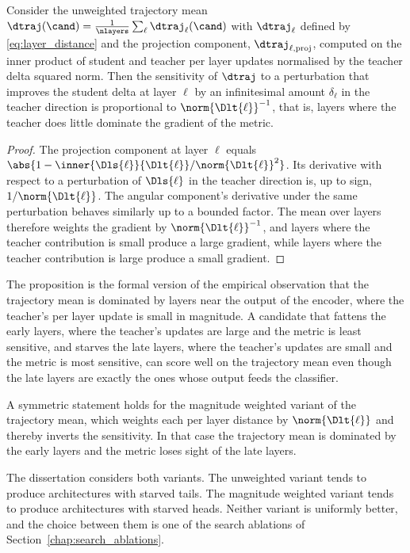 \begin{proposition}
\label{prop:magnitude_bias}
Consider the unweighted trajectory mean $\dtraj(\cand) = \frac{1}{\nlayers} \sum_\ell \dtraj_\ell(\cand)$ with $\dtraj_\ell$ defined by \eqref{eq:layer_distance} and the projection component, $\dtraj_{\ell, \mathrm{proj}}$, computed on the inner product of student and teacher per layer updates normalised by the teacher delta squared norm. Then the sensitivity of $\dtraj$ to a perturbation that improves the student delta at layer $\ell$ by an infinitesimal amount $\delta_\ell$ in the teacher direction is proportional to $\norm{\Dlt{\ell}}^{-1}$, that is, layers where the teacher does little dominate the gradient of the metric.
\end{proposition}
\begin{proof}
The projection component at layer $\ell$ equals $\abs{1 - \inner{\Dls{\ell}}{\Dlt{\ell}} / \norm{\Dlt{\ell}}^2}$. Its derivative with respect to a perturbation of $\Dls{\ell}$ in the teacher direction is, up to sign, $1 / \norm{\Dlt{\ell}}$. The angular component's derivative under the same perturbation behaves similarly up to a bounded factor. The mean over layers therefore weights the gradient by $\norm{\Dlt{\ell}}^{-1}$, and layers where the teacher contribution is small produce a large gradient, while layers where the teacher contribution is large produce a small gradient.
\end{proof}

The proposition is the formal version of the empirical observation that the trajectory mean is dominated by layers near the output of the encoder, where the teacher's per layer update is small in magnitude. A candidate that fattens the early layers, where the teacher's updates are large and the metric is least sensitive, and starves the late layers, where the teacher's updates are small and the metric is most sensitive, can score well on the trajectory mean even though the late layers are exactly the ones whose output feeds the classifier.

A symmetric statement holds for the magnitude weighted variant of the trajectory mean, which weights each per layer distance by $\norm{\Dlt{\ell}}$ and thereby inverts the sensitivity. In that case the trajectory mean is dominated by the early layers and the metric loses sight of the late layers.

The dissertation considers both variants. The unweighted variant tends to produce architectures with starved tails. The magnitude weighted variant tends to produce architectures with starved heads. Neither variant is uniformly better, and the choice between them is one of the search ablations of Section~\ref{chap:search_ablations}.

